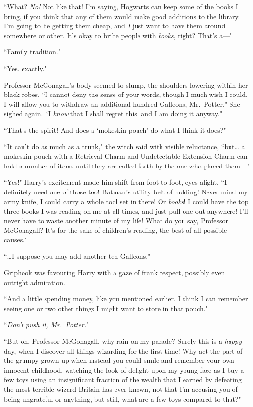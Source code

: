 ``What? \emph{No!} Not like that! I'm saying, Hogwarts can keep some of the books I bring, if you think that any of them would make good additions to the library. I'm going to be getting them cheap, and \emph{I} just want to have them around somewhere or other. It's okay to bribe people with \emph{books}, right? That's a—"

``Family tradition."

``Yes, exactly."

Professor McGonagall's body seemed to slump, the shoulders lowering within her black robes. ``I cannot deny the sense of your words, though I much wish I could. I will allow you to withdraw an additional hundred Galleons, Mr.~Potter." She sighed again. ``I \emph{know} that I shall regret this, and I am doing it anyway."

``That's the spirit! And does a `mokeskin pouch' do what I think it does?"

``It can't do as much as a trunk," the witch said with visible reluctance, ``but{\ldots} a mokeskin pouch with a Retrieval Charm and Undetectable Extension Charm can hold a number of items until they are called forth by the one who placed them---"

``Yes!" Harry's excitement made him shift from foot to foot, eyes alight. ``I definitely need one of those too! Batman's utility belt of holding! Never mind my army knife, I could carry a whole tool set in there! Or \emph{books}! I could have the top three books I was reading on me at all times, and just pull one out anywhere! I'll never have to waste another minute of my life! What do you say, Professor McGonagall? It's for the sake of children's reading, the best of all possible causes."

``{\ldots}I suppose you may add another ten Galleons."

Griphook was favouring Harry with a gaze of frank respect, possibly even outright admiration.

``And a little spending money, like you mentioned earlier. I think I can remember seeing one or two other things I might want to store in that pouch."

``\emph{Don't push it, Mr.~Potter.}"

``But oh, Professor McGonagall, why rain on my parade? Surely this is a \emph{happy} day, when I discover all things wizarding for the first time! Why act the part of the grumpy grown-up when instead you could smile and remember your own innocent childhood, watching the look of delight upon my young face as I buy a few toys using an insignificant fraction of the wealth that I earned by defeating the most terrible wizard Britain has ever known, not that I'm accusing you of being ungrateful or anything, but still, what are a few toys compared to that?"

